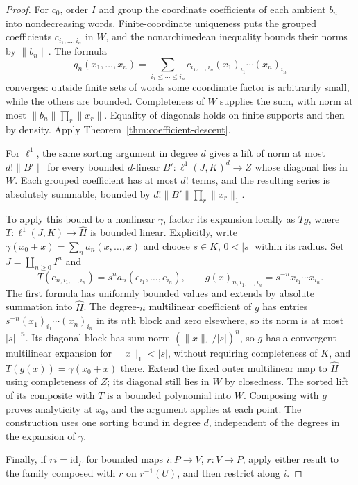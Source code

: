\documentclass[11pt]{amsart}
\theoremstyle{definition}
\theoremstyle{remark}
\numberwithin{equation}{section}
\newcommand{\id}{\mathrm{id}}
\newcommand{\abs}[1]{\lvert #1\rvert}
\newcommand{\norm}[1]{\lVert #1\rVert}
\begin{document}
\begin{proof}
For $c_0$, order $I$ and group the coordinate coefficients of each ambient $b_n$ into nondecreasing words. Finite-coordinate uniqueness puts the grouped coefficients $c_{i_1,\ldots,i_n}$ in $W$, and the nonarchimedean inequality bounds their norms by $\norm{b_n}$. The formula
\[
 q_n(x_1,\ldots,x_n)
 =\sum_{i_1\le\cdots\le i_n}
 c_{i_1,\ldots,i_n}(x_1)_{i_1}\cdots(x_n)_{i_n}
\]
converges: outside finite sets of words some coordinate factor is arbitrarily small, while the others are bounded. Completeness of $W$ supplies the sum, with norm at most $\norm{b_n}\prod_r\norm{x_r}$. Equality of diagonals holds on finite supports and then by density. Apply Theorem~\ref{thm:coefficient-descent}.

For $\ell^1$, the same sorting argument in degree $d$ gives a lift of norm at most $d!\norm{B'}$ for every bounded $d$-linear $B'\colon\ell^1(J,K)^d\to Z$ whose diagonal lies in $W$. Each grouped coefficient has at most $d!$ terms, and the resulting series is absolutely summable, bounded by $d!\norm{B'}\prod_r\norm{x_r}_1$.

To apply this bound to a nonlinear $\gamma$, factor its expansion locally as $Tg$, where $T\colon\ell^1(J,K)\to\widehat H$ is bounded linear. Explicitly, write $\gamma(x_0+x)=\sum_na_n(x,\ldots,x)$ and choose $s\in K$, $0<\abs s$ within its radius. Set $J=\coprod_{n\ge0}I^n$ and
\[
 T(e_{n,i_1,\ldots,i_n})=s^na_n(e_{i_1},\ldots,e_{i_n}),
 \qquad
 g(x)_{n,i_1,\ldots,i_n}=s^{-n}x_{i_1}\cdots x_{i_n}.
\]
The first formula has uniformly bounded values and extends by absolute summation into $\widehat H$.
The degree-$n$ multilinear coefficient of $g$ has entries
$s^{-n}(x_1)_{i_1}\cdots(x_n)_{i_n}$ in its $n$th block and zero elsewhere, so its norm is at most
$\abs s^{-n}$. Its diagonal block has sum norm $(\norm{x}_1/\abs s)^n$, so $g$ has a convergent
multilinear expansion for $\norm{x}_1<\abs s$, without requiring completeness of $K$, and $T(g(x))=\gamma(x_0+x)$ there.
Extend the fixed outer multilinear map to $\widehat H$ using completeness of $Z$; its diagonal still
lies in $W$ by closedness. The sorted lift of its composite with $T$ is a bounded polynomial into $W$.
Composing with $g$ proves analyticity at $x_0$, and the argument applies at each point.
The construction uses one sorting bound in degree $d$,
independent of the degrees in the expansion of $\gamma$.

Finally, if $ri=\id_P$ for bounded maps $i\colon P\to V$, $r\colon V\to P$, apply either result to the family composed with $r$ on $r^{-1}(U)$, and then restrict along $i$.
\end{proof}
\end{document}
